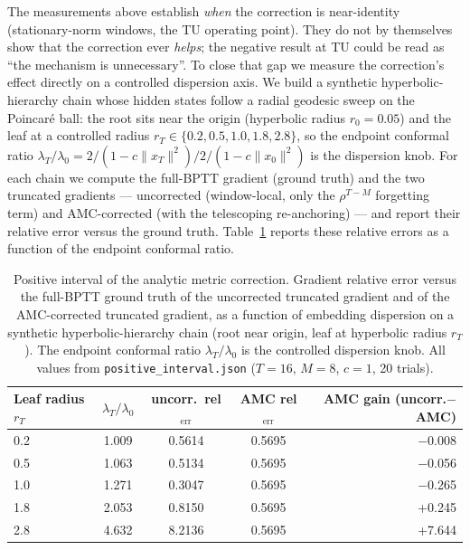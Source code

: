 \documentclass[a4paper,fleqn]{cas-dc}
\begin{document}
The measurements above establish \emph{when} the correction is near-identity
(stationary-norm windows, the TU operating point). They do not by themselves
show that the correction ever \emph{helps}; the negative result at TU could be
read as ``the mechanism is unnecessary''. To close that gap we measure the
correction's effect directly on a controlled dispersion axis. We build a
synthetic hyperbolic-hierarchy chain whose hidden states follow a radial
geodesic sweep on the Poincar\'e ball: the root sits near the origin
(hyperbolic radius $r_0{=}0.05$) and the leaf at a controlled radius
$r_T\in\{0.2,0.5,1.0,1.8,2.8\}$, so the endpoint conformal ratio
$\lambda_T/\lambda_0=2/(1-c\|x_T\|^2)\big/2/(1-c\|x_0\|^2)$ is the dispersion
knob. For each chain we compute the full-BPTT gradient (ground truth) and the
two truncated gradients --- uncorrected (window-local, only the
$\rho^{T-M}$ forgetting term) and AMC-corrected (with the telescoping
re-anchoring) --- and report their relative error versus the ground truth. Table~\ref{tab:positive_interval} reports these relative errors as a function of the endpoint conformal ratio.

\begin{table}[htbp]
\caption{Positive interval of the analytic metric correction. Gradient relative
error versus the full-BPTT ground truth of the uncorrected truncated gradient and
of the AMC-corrected truncated gradient, as a function of embedding dispersion on
a synthetic hyperbolic-hierarchy chain (root near origin, leaf at hyperbolic
radius $r_T$). The endpoint conformal ratio $\lambda_T/\lambda_0$ is the controlled
dispersion knob. All values from \texttt{positive\_interval.json}
($T{=}16$, $M{=}8$, $c{=}1$, 20 trials).}
\label{tab:positive_interval}
\centering\footnotesize
\begin{tabular}{@{}lcccr@{}}
\toprule
Leaf radius $r_T$ & $\lambda_T/\lambda_0$ & uncorr.\ rel$_{\text{err}}$ & AMC rel$_{\text{err}}$ & AMC gain (uncorr.$-$AMC) \\
\midrule
0.2 & 1.009 & 0.5614 & 0.5695 & $-$0.008 \\
0.5 & 1.063 & 0.5134 & 0.5695 & $-$0.056 \\
1.0 & 1.271 & 0.3047 & 0.5695 & $-$0.265 \\
1.8 & 2.053 & 0.8150 & 0.5695 & +0.245 \\
2.8 & 4.632 & 8.2136 & 0.5695 & +7.644 \\
\bottomrule
\end{tabular}
\end{table}
\end{document}
